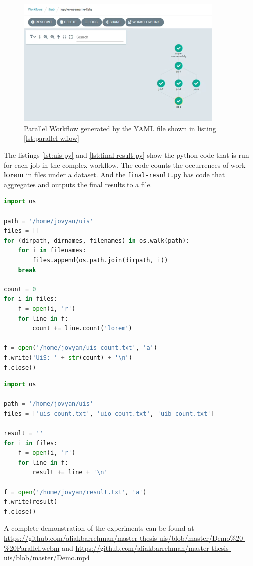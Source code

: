 \begin{figure}
    \centering
    \includegraphics[width=10cm,keepaspectratio]{photos/parallel-wflow.png}
    \caption{Parallel Workflow generated by the YAML file shown in listing \ref{lst:parallel-wflow}}
    \label{fig:parallel-wflow}
\end{figure}

\bigskip
The listings \ref{lst:uis-py} and \ref{lst:final-result-py} show the python code that is run for each job in the complex workflow. The code counts the occurrences of work \textbf{lorem} in files under a dataset. And the \lstinline{final-result.py} has code that aggregates and outputs the final results to a file.

\begin{lstlisting}[language=python,caption={uis.py similar to uio.py and uib.py. The code that is run for the parallel jobs},label={lst:uis-py}]
import os

path = '/home/jovyan/uis'
files = []
for (dirpath, dirnames, filenames) in os.walk(path):
    for i in filenames:
        files.append(os.path.join(dirpath, i))
    break
    
count = 0
for i in files:
    f = open(i, 'r')
    for line in f:
        count += line.count('lorem')

f = open('/home/jovyan/uis-count.txt', 'a')
f.write('UiS: ' + str(count) + '\n')
f.close()
\end{lstlisting}

\bigskip

\begin{lstlisting}[language=python,caption={final-result.py that combines the output of the parallel jobs and computes the output},label={lst:final-result-py}]
import os

path = '/home/jovyan/uis'
files = ['uis-count.txt', 'uio-count.txt', 'uib-count.txt']

result = ''
for i in files:
    f = open(i, 'r')
    for line in f:
        result += line + '\n'

f = open('/home/jovyan/result.txt', 'a')
f.write(result)
f.close()
\end{lstlisting}

A complete demonstration of the experiments can be found at \url{https://github.com/aliakbarrehman/master-thesis-uis/blob/master/Demo\%20-\%20Parallel.webm} and \url{https://github.com/aliakbarrehman/master-thesis-uis/blob/master/Demo.mp4}